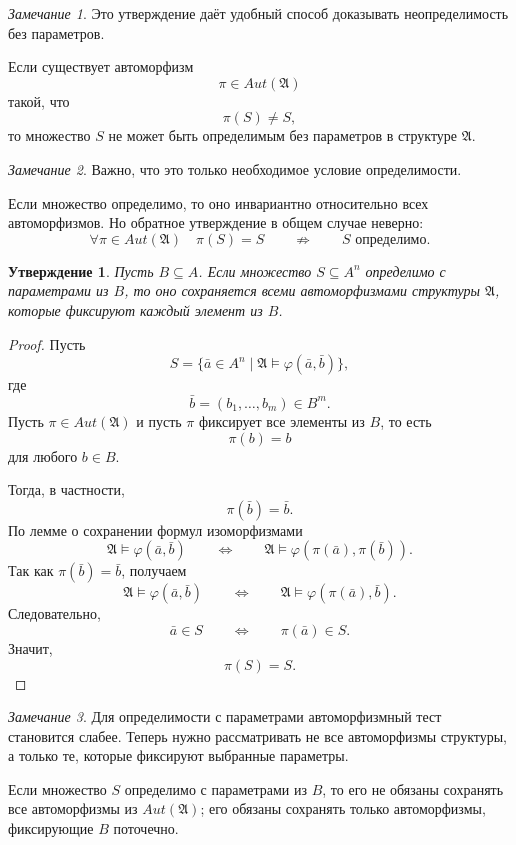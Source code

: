 \documentclass[12pt,a4paper,oneside,openany]{book}
\theoremstyle{definition}
\theoremstyle{plain}
\newtheorem{proposition}{Утверждение}[chapter]
\theoremstyle{remark}
\newtheorem{remark}{Замечание}[chapter]
\begin{document}
\begin{remark}
Это утверждение даёт удобный способ доказывать неопределимость без параметров.

Если существует автоморфизм
\[
\pi\in Aut(\mathfrak A)
\]
такой, что
\[
\pi(S)\ne S,
\]
то множество $S$ не может быть определимым без параметров в структуре $\mathfrak A$.
\end{remark}

\begin{remark}
Важно, что это только необходимое условие определимости.

Если множество определимо, то оно инвариантно относительно всех автоморфизмов. Но обратное утверждение в общем случае неверно:
\[
\forall \pi\in Aut(\mathfrak A)\quad \pi(S)=S
\qquad
\not\Longrightarrow
\qquad
S\text{ определимо}.
\]
\end{remark}

\begin{proposition}
Пусть $B\subseteq A$. Если множество $S\subseteq A^n$ определимо с параметрами из $B$, то оно сохраняется всеми автоморфизмами структуры $\mathfrak A$, которые фиксируют каждый элемент из $B$.
\end{proposition}

\begin{proof}
Пусть
\[
S=
\{\bar a\in A^n\mid \mathfrak A\models\varphi(\bar a,\bar b)\},
\]
где
\[
\bar b=(b_1,\ldots,b_m)\in B^m.
\]
Пусть $\pi\in Aut(\mathfrak A)$ и пусть $\pi$ фиксирует все элементы из $B$, то есть
\[
\pi(b)=b
\]
для любого $b\in B$.

Тогда, в частности,
\[
\pi(\bar b)=\bar b.
\]
По лемме о сохранении формул изоморфизмами
\[
\mathfrak A\models\varphi(\bar a,\bar b)
\qquad
\Longleftrightarrow
\qquad
\mathfrak A\models\varphi(\pi(\bar a),\pi(\bar b)).
\]
Так как $\pi(\bar b)=\bar b$, получаем
\[
\mathfrak A\models\varphi(\bar a,\bar b)
\qquad
\Longleftrightarrow
\qquad
\mathfrak A\models\varphi(\pi(\bar a),\bar b).
\]
Следовательно,
\[
\bar a\in S
\qquad
\Longleftrightarrow
\qquad
\pi(\bar a)\in S.
\]
Значит,
\[
\pi(S)=S.
\]
\end{proof}

\begin{remark}
Для определимости с параметрами автоморфизмный тест становится слабее. Теперь нужно рассматривать не все автоморфизмы структуры, а только те, которые фиксируют выбранные параметры.

Если множество $S$ определимо с параметрами из $B$, то его не обязаны сохранять все автоморфизмы из $Aut(\mathfrak A)$; его обязаны сохранять только автоморфизмы, фиксирующие $B$ поточечно.
\end{remark}
\end{document}
